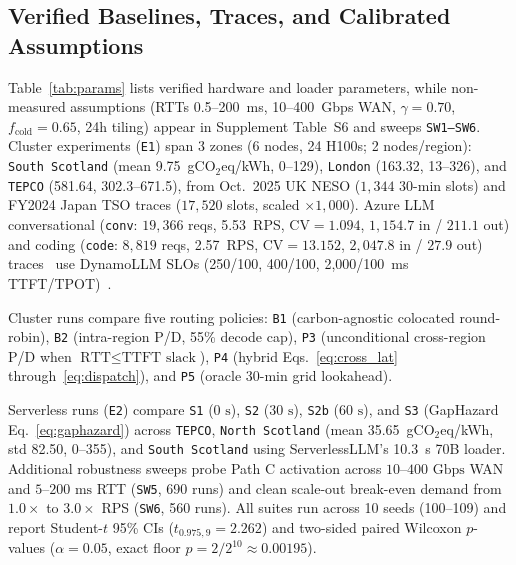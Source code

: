 \subsection{Verified Baselines, Traces, and Calibrated Assumptions}\label{subsec:traces_params}
Table~\ref{tab:params} lists verified hardware and loader parameters, while non-measured assumptions (RTTs 0.5--200~ms, 10--400~Gbps WAN, $\gamma=0.70$, $f_{\text{cold}}=0.65$, 24h tiling) appear in Supplement Table~S6 and sweeps \texttt{SW1--SW6}. Cluster experiments (\texttt{E1}) span 3 zones (6 nodes, 24 H100s; 2 nodes/region): \texttt{South Scotland} (mean 9.75~gCO$_2$eq/kWh, 0--129), \texttt{London} (163.32, 13--326), and \texttt{TEPCO} (581.64, 302.3--671.5), from Oct.\ 2025 UK NESO ($1{,}344$ 30-min slots) and FY2024 Japan TSO traces ($17{,}520$ slots, scaled $\times 1{,}000$). Azure LLM conversational (\texttt{conv}: $19{,}366$ reqs, 5.53~RPS, $\text{CV}=1.094$, $1{,}154.7$ in / $211.1$ out) and coding (\texttt{code}: $8{,}819$ reqs, 2.57~RPS, $\text{CV}=13.152$, $2{,}047.8$ in / $27.9$ out) traces~\cite{azure2024trace} use DynamoLLM SLOs (250/100, 400/100, 2,000/100~ms TTFT/TPOT)~\cite{stojkovic2025dynamollm}.

Cluster runs compare five routing policies: \texttt{B1} (carbon-agnostic colocated round-robin), \texttt{B2} (intra-region P/D, 55\% decode cap), \texttt{P3} (unconditional cross-region P/D when $\text{RTT} \le \text{TTFT slack}$), \texttt{P4} (hybrid Eqs.~\eqref{eq:cross_lat} through~\eqref{eq:dispatch}), and \texttt{P5} (oracle 30-min grid lookahead).

Serverless runs (\texttt{E2}) compare \texttt{S1} ($0\text{ s}$), \texttt{S2} ($30\text{ s}$), \texttt{S2b} ($60\text{ s}$), and \texttt{S3} (GapHazard Eq.~\eqref{eq:gaphazard}) across \texttt{TEPCO}, \texttt{North Scotland} (mean 35.65~gCO$_2$eq/kWh, std 82.50, 0--355), and \texttt{South Scotland} using ServerlessLLM's \SI{10.3}{\second} 70B loader. Additional robustness sweeps probe Path C activation across $10\text{--}400\text{ Gbps}$ WAN and $5\text{--}200\text{ ms}$ RTT (\texttt{SW5}, 690 runs) and clean scale-out break-even demand from $1.0\times$ to $3.0\times$ RPS (\texttt{SW6}, 560 runs). All suites run across 10 seeds (100--109) and report Student-$t$ 95\% CIs ($t_{0.975,9}=2.262$) and two-sided paired Wilcoxon $p$-values ($\alpha=0.05$, exact floor $p = 2/2^{10} \approx 0.00195$).

